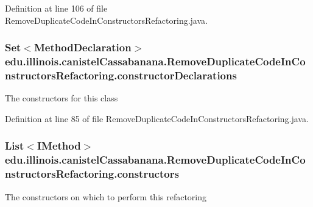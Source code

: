 Definition at line 106 of file RemoveDuplicateCodeInConstructorsRefactoring.java.

\hypertarget{classedu_1_1illinois_1_1canistelCassabanana_1_1RemoveDuplicateCodeInConstructorsRefactoring_a39607f363fde072a17c90ed499dd113b}{
\subsubsection[{constructorDeclarations}]{\setlength{\rightskip}{0pt plus 5cm}Set$<$MethodDeclaration$>$ {\bf edu.illinois.canistelCassabanana.RemoveDuplicateCodeInConstructorsRefactoring.constructorDeclarations}}}
\label{classedu_1_1illinois_1_1canistelCassabanana_1_1RemoveDuplicateCodeInConstructorsRefactoring_a39607f363fde072a17c90ed499dd113b}
The constructors for this class 

Definition at line 85 of file RemoveDuplicateCodeInConstructorsRefactoring.java.

\hypertarget{classedu_1_1illinois_1_1canistelCassabanana_1_1RemoveDuplicateCodeInConstructorsRefactoring_a9d31c4c2b04e3ed5a8450714a08f1381}{
\subsubsection[{constructors}]{\setlength{\rightskip}{0pt plus 5cm}List$<$IMethod$>$ {\bf edu.illinois.canistelCassabanana.RemoveDuplicateCodeInConstructorsRefactoring.constructors}}}
\label{classedu_1_1illinois_1_1canistelCassabanana_1_1RemoveDuplicateCodeInConstructorsRefactoring_a9d31c4c2b04e3ed5a8450714a08f1381}
The constructors on which to perform this refactoring 

